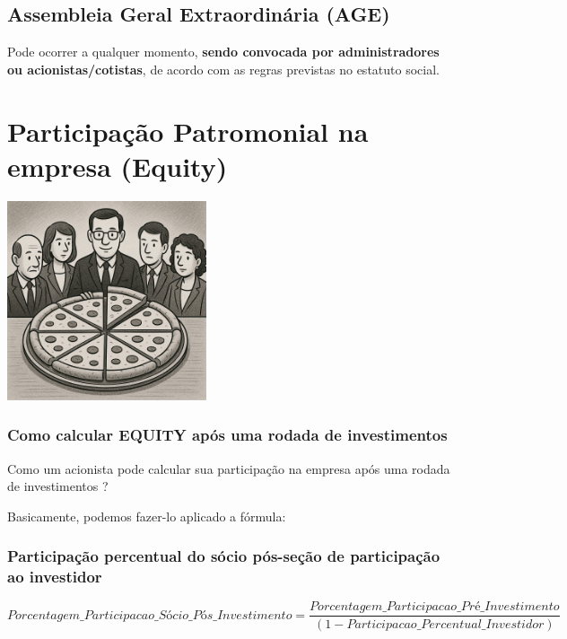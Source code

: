 \documentclass[
]{book}
\begin{document}
\subsection{\texorpdfstring{\textbf{Assembleia Geral Extraordinária (AGE)}}{Assembleia Geral Extraordinária (AGE)}}\label{assembleia-geral-extraordinuxe1ria-age}

Pode ocorrer a qualquer momento, \textbf{sendo convocada por administradores ou acionistas/cotistas}, de acordo com as regras previstas no estatuto social.

\section{Participação Patromonial na empresa (Equity)}\label{participauxe7uxe3o-patromonial-na-empresa-equity}

\includegraphics[width=2.3125in,height=\textheight]{images/03-2025-08-19_20/02-assembleia_cotistas-equity.jpg}

\subsubsection{Como calcular EQUITY após uma rodada de investimentos}\label{como-calcular-equity-apuxf3s-uma-rodada-de-investimentos}

Como um acionista pode calcular sua participação na empresa após uma rodada de investimentos ?

Basicamente, podemos fazer-lo aplicado a fórmula:

\subsubsection{Participação percentual do sócio pós-seção de participação ao investidor}\label{participauxe7uxe3o-percentual-do-suxf3cio-puxf3s-seuxe7uxe3o-de-participauxe7uxe3o-ao-investidor}

\[
Porcentagem\_Participacao\_Sócio\_Pós\_Investimento = \frac{Porcentagem\_Participacao\_Pré\_Investimento}{(1 - Participacao\_Percentual\_Investidor)}
\]
\end{document}

